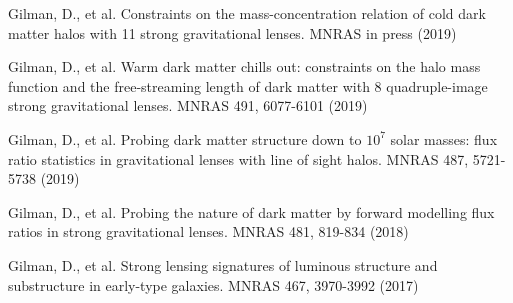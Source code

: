 {{Gilman, D., et al. Constraints on the mass-concentration relation of cold dark matter halos with 11 strong gravitational lenses. MNRAS in press (2019)
		
\noindent Gilman, D., et al. Warm dark matter chills out: constraints on the halo mass function and the free-streaming length of dark matter with 8 quadruple-image strong gravitational lenses. MNRAS 491, 6077-6101 (2019)

\noindent Gilman, D., et al.  Probing dark matter structure down to $10^7$ solar masses: flux ratio statistics in gravitational lenses with line of sight halos. MNRAS 487, 5721-5738 (2019)

\noindent Gilman, D., et al. Probing the nature of dark matter by forward modelling flux ratios in strong gravitational lenses. MNRAS 481, 819-834 (2018)

\noindent Gilman, D., et al. Strong lensing signatures of luminous structure and substructure in early-type galaxies. MNRAS 467, 3970-3992 (2017) 

}}